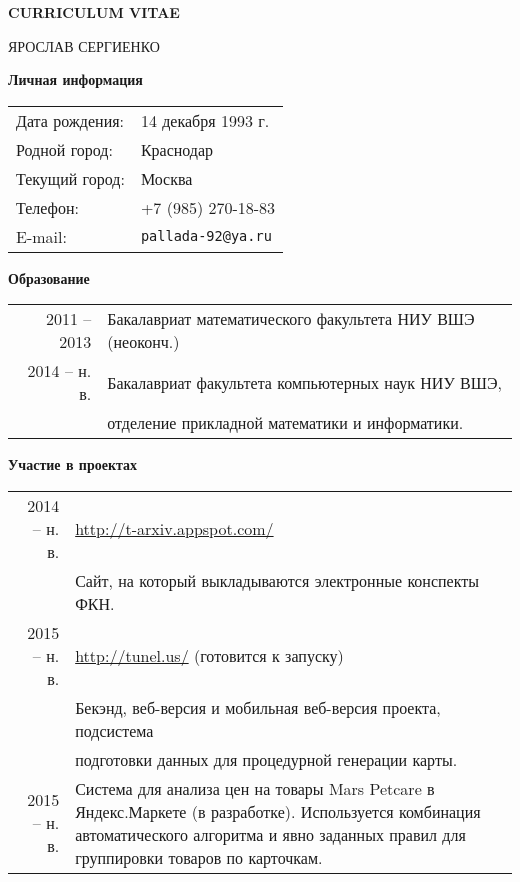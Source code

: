 \documentclass[11pt]{article}
\begin{document}
\centerline{\Large\bfseries CURRICULUM VITAE}
\vspace{20pt}
\centerline{\large ЯРОСЛАВ СЕРГИЕНКО}
\vspace{40pt}
{\bfseries Личная информация}
\vspace{10pt}

\begin{tabular}{l l}
Дата рождения: & 14 декабря 1993 г.\\
Родной город: & Краснодар \\
Текущий город: & Москва \\
Телефон: & +7 (985) 270-18-83\\
E-mail: & \texttt{pallada-92@ya.ru}
\end{tabular}

\vspace{30pt}

{\bfseries Образование}
\vspace{10pt}

\begin{tabular}{r p{11.5cm}}
\footnotesize{2011 -- 2013} & Бакалавриат математического факультета НИУ ВШЭ (неоконч.)\\
\footnotesize{2014 -- н. в.} & Бакалавриат факультета компьютерных наук НИУ ВШЭ,\\ & отделение прикладной математики и информатики.
\end{tabular}
\vspace{30pt}

{\bfseries Участие в проектах}
\vspace{10pt}

\begin{tabular}{r p{11.5cm}}
\footnotesize{2014 -- н. в.} & \url{http://t-arxiv.appspot.com/}\\
& Сайт, на который выкладываются электронные конспекты ФКН.\\
\footnotesize{2015 -- н. в.} & \url{http://tunel.us/} (готовится к запуску)\\
& Бекэнд, веб-версия и мобильная веб-версия проекта, подсистема\\
& подготовки данных для процедурной генерации карты.\\
\footnotesize{2015 -- н. в.} & Система для анализа цен на товары Mars Petcare в Яндекс.Маркете (в разработке). Используется комбинация автоматического алгоритма и явно заданных правил для группировки товаров по карточкам.
\end{tabular}
\vspace{30pt}
\end{document}
